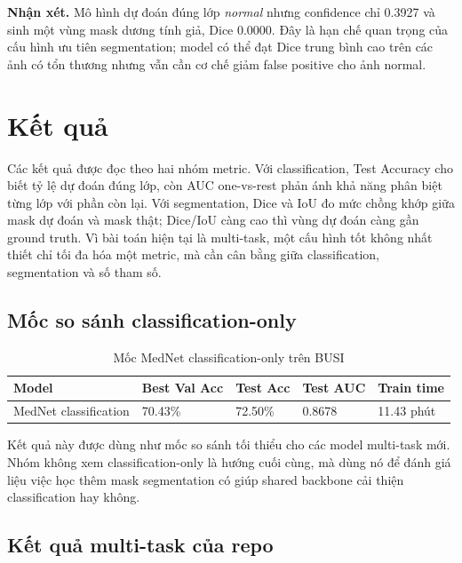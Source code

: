 \documentclass[12pt,a4paper]{article}
\begin{document}
\noindent\textbf{Nhận xét.}
Mô hình dự đoán đúng lớp \textit{normal} nhưng confidence chỉ 0.3927 và sinh một vùng mask dương tính giả, Dice 0.0000. Đây là hạn chế quan trọng của cấu hình ưu tiên segmentation; model có thể đạt Dice trung bình cao trên các ảnh có tổn thương nhưng vẫn cần cơ chế giảm false positive cho ảnh normal.

\section{Kết quả}

Các kết quả được đọc theo hai nhóm metric. Với classification, Test Accuracy cho biết tỷ lệ dự đoán đúng lớp, còn AUC one-vs-rest phản ánh khả năng phân biệt từng lớp với phần còn lại. Với segmentation, Dice và IoU đo mức chồng khớp giữa mask dự đoán và mask thật; Dice/IoU càng cao thì vùng dự đoán càng gần ground truth. Vì bài toán hiện tại là multi-task, một cấu hình tốt không nhất thiết chỉ tối đa hóa một metric, mà cần cân bằng giữa classification, segmentation và số tham số.

\subsection{Mốc so sánh classification-only}

\begin{table}[H]
\centering
\caption{Mốc MedNet classification-only trên BUSI}
\renewcommand{\arraystretch}{1.25}
\begin{tabular}{p{3.8cm} p{2.5cm} p{2.5cm} p{2.5cm} p{2.5cm}}
\toprule
\textbf{Model} & \textbf{Best Val Acc} & \textbf{Test Acc} & \textbf{Test AUC} & \textbf{Train time} \\
\midrule
MedNet classification & 70.43\% & 72.50\% & 0.8678 & 11.43 phút \\
\bottomrule
\end{tabular}
\end{table}

Kết quả này được dùng như mốc so sánh tối thiểu cho các model multi-task mới. Nhóm không xem classification-only là hướng cuối cùng, mà dùng nó để đánh giá liệu việc học thêm mask segmentation có giúp shared backbone cải thiện classification hay không.

\subsection{Kết quả multi-task của repo}
\end{document}
